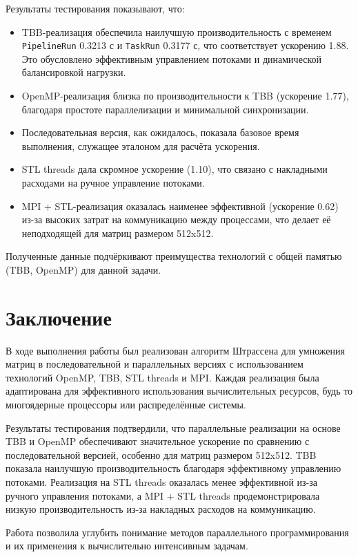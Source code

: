 \documentclass[14pt,a4paper]{extarticle}
\begin{document}
Результаты тестирования показывают, что:
\begin{itemize}
    \item TBB-реализация обеспечила наилучшую производительность с временем \texttt{PipelineRun} 0.3213 с и \texttt{TaskRun} 0.3177 с, что соответствует ускорению 1.88. Это обусловлено эффективным управлением потоками и динамической балансировкой нагрузки.
    \item OpenMP-реализация близка по производительности к TBB (ускорение 1.77), благодаря простоте параллелизации и минимальной синхронизации.
    \item Последовательная версия, как ожидалось, показала базовое время выполнения, служащее эталоном для расчёта ускорения.
    \item STL threads дала скромное ускорение (1.10), что связано с накладными расходами на ручное управление потоками.
    \item MPI + STL-реализация оказалась наименее эффективной (ускорение 0.62) из-за высоких затрат на коммуникацию между процессами, что делает её неподходящей для матриц размером 512x512.
\end{itemize}

Полученные данные подчёркивают преимущества технологий с общей памятью (TBB, OpenMP) для данной задачи.

\section{Заключение}

В ходе выполнения работы был реализован алгоритм Штрассена для умножения матриц в последовательной и параллельных версиях с использованием технологий OpenMP, TBB, STL threads и MPI. Каждая реализация была адаптирована для эффективного использования вычислительных ресурсов, будь то многоядерные процессоры или распределённые системы.

Результаты тестирования подтвердили, что параллельные реализации на основе TBB и OpenMP обеспечивают значительное ускорение по сравнению с последовательной версией, особенно для матриц размером 512x512. TBB показала наилучшую производительность благодаря эффективному управлению потоками. Реализация на STL threads оказалась менее эффективной из-за ручного управления потоками, а MPI + STL threads продемонстрировала низкую производительность из-за накладных расходов на коммуникацию.

Работа позволила углубить понимание методов параллельного программирования и их применения к вычислительно интенсивным задачам.
\end{document}
